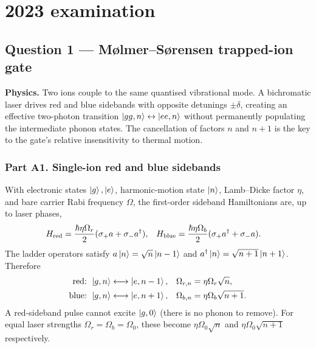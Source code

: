 \clearpage
\section{2023 examination}
\subsection{Question 1 --- M\o lmer--S\o rensen trapped-ion gate}
\begin{idea}
\textbf{Physics.} Two ions couple to the same quantised vibrational mode. A bichromatic laser drives red and blue sidebands with opposite detunings $\pm\delta$, creating an effective two-photon transition $\left\lvert gg,n\right\rangle\leftrightarrow\left\lvert ee,n\right\rangle$ without permanently populating the intermediate phonon states. The cancellation of factors $n$ and $n+1$ is the key to the gate's relative insensitivity to thermal motion.
\end{idea}
\subsubsection*{Part A1. Single-ion red and blue sidebands}
With electronic states $\left\lvert g\right\rangle,\left\lvert e\right\rangle$, harmonic-motion state $\left\lvert n\right\rangle$, Lamb--Dicke factor $\eta$, and bare carrier Rabi frequency $\Omega$, the first-order sideband Hamiltonians are, up to laser phases,
\begin{align}
H_{\rm red}&=\frac{\hbar\eta\Omega_r}{2}(\sigma_+a+\sigma_-a^\dagger),&
H_{\rm blue}&=\frac{\hbar\eta\Omega_b}{2}(\sigma_+a^\dagger+\sigma_-a).
\end{align}
The ladder operators satisfy $a\left\lvert n\right\rangle=\sqrt n\left\lvert n-1\right\rangle$ and $a^\dagger\left\lvert n\right\rangle=\sqrt{n+1}\left\lvert n+1\right\rangle$. Therefore
\begin{align}
\text{red: }&\left\lvert g,n\right\rangle\longleftrightarrow\left\lvert e,n-1\right\rangle,& \Omega_{r,n}&=\eta\Omega_r\sqrt n,\label{eq:23red}\\
\text{blue: }&\left\lvert g,n\right\rangle\longleftrightarrow\left\lvert e,n+1\right\rangle,&\Omega_{b,n}&=\eta\Omega_b\sqrt{n+1}.\label{eq:23blue}
\end{align}
A red-sideband pulse cannot excite $\left\lvert g,0\right\rangle$ (there is no phonon to remove). For equal laser strengths $\Omega_r=\Omega_b=\Omega_0$, these become $\eta\Omega_0\sqrt n$ and $\eta\Omega_0\sqrt{n+1}$ respectively.

